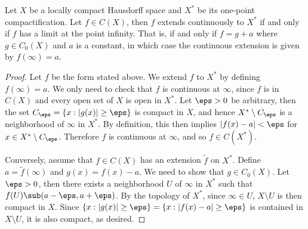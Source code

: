 \begin{proposition}\label{LCH one-point compactification continuous function}
Let $X$ be a locally compact Hausdorff space and $X^*$ be its one-point compactification. Let $f\in C(X)$, then $f$ extends continuously to $X^*$ if and only if $f$ has a limit at the point infinity. That is, if and only if $f=g+a$ where $g\in C_0(X)$ and $a$ is a constant, in which case the continuous extension is given by $f(\infty)=a$.
\end{proposition}
\begin{proof}
Let $f$ be the form stated above. We extend $f$ to $X^*$ by defining $f(\infty)=a$. We only need to check that $f$ is continuous at $\infty$, since $f$ is in $C(X)$ and every open set of $X$ is open in $X^*$. Let $\eps>0$ be arbitrary, then the set $C_\eps=\{x:|g(x)|\geq\eps\}$ is compact in $X$, and hence $X^*\setminus C_\eps$ is a neighborhood of $\infty$ in $X^*$. By definition, this then implies $|f(x)-a|<\eps$ for $x\in X^*\setminus C_\eps$. Therefore $f$ is continuous at $\infty$, and so $f\in C(X^*)$.\par
Conversely, assume that $f\in C(X)$ has an extension $\widetilde{f}$ on $X^*$. Define $a=\widetilde{f}(\infty)$ and $g(x)=f(x)-a$. We need to show that $g\in C_0(X)$. Let $\eps>0$, then there exists a neighborhood $U$ of $\infty$ in $X^*$ such that $f(U)\sub(a-\eps,a+\eps)$. By the topology of $X^*$, since $\infty\in U$, $X\setminus U$ is then compact in $X$. Since $\{x:|g(x)|\geq\eps\}=\{x:|f(x)-a|\geq\eps\}$ is contained in $X\setminus U$, it is also compact, as desired.
\end{proof}
